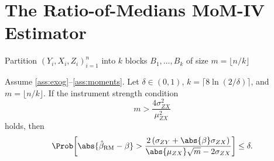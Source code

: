 \section{The Ratio-of-Medians MoM-IV Estimator}
\label{sec:rom}

\begin{algorithm}[H]
\label{alg:rom}
\caption{Ratio-of-Medians Estimator}

Partition $(Y_i,X_i,Z_i)_{i=1}^{n}$ into $k$ blocks $B_1, \dots, B_k$ of size $m = \lfloor n/k \rfloor$\;


\end{algorithm}

\begin{theorem}
\label{thm:rom}
Assume \ref{ass:exog}--\ref{ass:moments}. Let $\delta \in (0,1)$, $k = \lceil 8\ln(2/\delta) \rceil$, and $m = \lfloor n/k \rfloor$. If the instrument strength condition
\begin{equation}
\label{eq:rom_strength}
    m > \frac{4\sigma_{ZX}^2}{\mu_{ZX}^2}
\end{equation}
holds, then
\begin{equation}
\label{eq:rom_bound}
    \Prob\!\left[\abs{\hat{\beta}_{\mathrm{RM}} - \beta} > \frac{2\left(\sigma_{ZY} + \abs{\beta}\sigma_{ZX}\right)}{\abs{\mu_{ZX}}\sqrt{m} - 2\sigma_{ZX}}\right] \leq \delta.
\end{equation}
\end{theorem}

